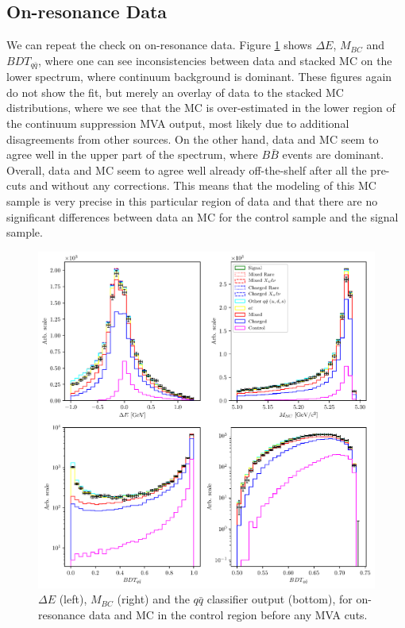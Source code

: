 \subsection{On-resonance Data}

We can repeat the check on on-resonance data. Figure \ref{fig:onres_control} shows $\Delta E$, $M_{BC}$ and $BDT_{q \bar q}$, where one can see inconsistencies between data and stacked MC on the lower spectrum, where continuum background is dominant. These figures again do not show the fit, but merely an overlay of data to the stacked MC distributions, where we see that the MC is over-estimated in the lower region of the continuum suppression MVA output, most likely due to additional disagreements from other sources. On the other hand, data and MC seem to agree well in the upper part of the spectrum, where $B \bar B$ events are dominant. Overall, data and MC seem to agree well already off-the-shelf after all the pre-cuts and without any corrections. This means that the modeling of this MC sample is very precise in this particular region of data and that there are no significant differences between data an MC for the control sample and the signal sample.
\begin{figure}[H]
	\centering
	\captionsetup{width=0.8\linewidth}
	\includegraphics[width=\linewidth]{fig/onres_control}
	\caption{$\Delta E$ (left), $M_{BC}$ (right) and the $q \bar q$ classifier output (bottom), for on-resonance data and MC in the control region before any MVA cuts.}
	\label{fig:onres_control}
\end{figure}